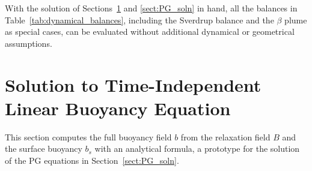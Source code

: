 \documentclass{ametsocV6.2}
\begin{document}
With the solution of Sections~\ref{sect:b_solution} and \ref{sect:PG_soln} in hand, all the balances in Table~\ref{tab:dynamical_balances}, including the Sverdrup balance and the $\beta$ plume as special cases, can be evaluated without additional dynamical or geometrical assumptions.


\section{Solution to Time-Independent Linear Buoyancy Equation}
\label{sect:b_solution}

This section computes the full buoyancy field $b$ from the relaxation field $B$ and the surface buoyancy $b_s$ with an analytical formula, a prototype for the solution of the PG equations in Section~\ref{sect:PG_soln}.
\end{document}
